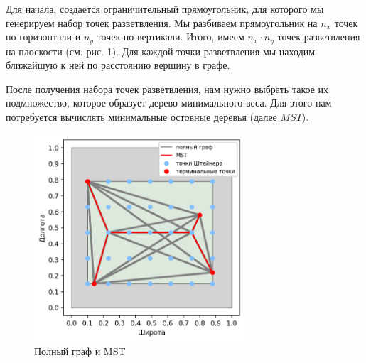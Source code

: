 Для начала, создается ограничительный прямоугольник, для которого мы генерируем набор точек разветвления. Мы разбиваем прямоугольник на $n_x$ точек по горизонтали и $n_y$ точек по вертикали. Итого, имеем $n_x \cdot n_y$  точек разветвления на плоскости (см. рис. 1). Для каждой точки разветвления мы находим ближайшую к ней по расстоянию вершину в графе.

После получения набора точек разветвления, нам нужно выбрать такое их подмножество, которое образует дерево минимального веса. Для этого нам потребуется вычислять минимальные остовные деревья (далее $MST$).
\begin{figure}[H]
	\includegraphics[width=0.7\textwidth]{images/4_2.png}
	\caption{Полный граф и MST}
\end{figure}
\vskip 4mm

